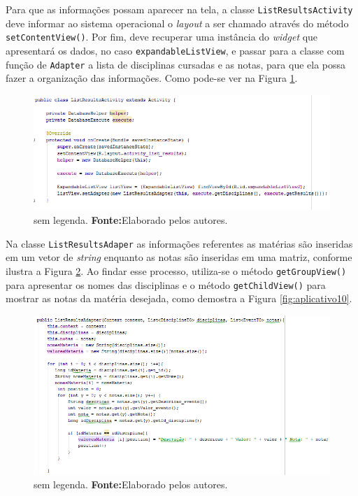 	\par Para que as informações possam aparecer na tela, a classe
\texttt{ListResultsActivity} deve informar ao sistema operacional o
\textit{layout} a ser chamado através do método \texttt{setContentView()}. Por
fim, deve recuperar uma instância do \textit{widget} que apresentará os dados,
no caso \texttt{expandableListView}, e passar para a classe com função de
\texttt{Adapter} a lista de disciplinas cursadas e as notas, para que ela possa
fazer a organização das informações. Como pode-se ver na Figura
\ref{fig:aplicativo8}.

	\begin{figure}[h!] 
		\centerline{\includegraphics[scale=0.60]{./imagens/2_q_metodologico/4_procedimentos_resultados/42_aplicativo/aplicativo8.png}}
		\caption[sem legenda]{sem legenda. \textbf{Fonte:}Elaborado pelos autores.}
		\label{fig:aplicativo8}
	\end{figure}

	\pagebreak
	
	\par Na classe \texttt{ListResultsAdaper} as informações referentes as matérias
são inseridas em um vetor de \textit{string} enquanto as notas são inseridas em
uma matriz, conforme ilustra a Figura \ref{fig:aplicativo9}. Ao findar esse processo,
utiliza-se o método \texttt{getGroupView()} para apresentar os nomes das disciplinas e o
método \texttt{getChildView()} para mostrar as notas da matéria desejada, como
demostra a Figura \ref{fig:aplicativo10}.


	\begin{figure}[h!] 
		\centerline{\includegraphics[scale=0.60]{./imagens/2_q_metodologico/4_procedimentos_resultados/42_aplicativo/aplicativo9.png}}
		\caption[sem legenda]{sem legenda. \textbf{Fonte:}Elaborado pelos autores.}
		\label{fig:aplicativo9}
	\end{figure}
	
